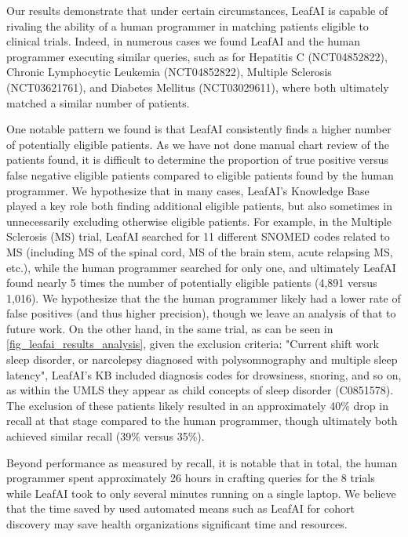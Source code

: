 \documentclass[../main.tex]{subfiles}
\begin{document}
Our results demonstrate that under certain circumstances, LeafAI is capable of rivaling the ability of a human programmer in matching patients eligible to clinical trials. Indeed, in numerous cases we found LeafAI and the human programmer executing similar queries, such as for Hepatitis C (NCT04852822), Chronic Lymphocytic Leukemia (NCT04852822), Multiple Sclerosis (NCT03621761), and Diabetes Mellitus (NCT03029611), where both ultimately matched a similar number of patients.

One notable pattern we found is that LeafAI consistently finds a higher number of potentially eligible patients. As we have not done manual chart review of the patients found, it is difficult to determine the proportion of true positive versus false negative eligible patients compared to eligible patients found by the human programmer. We hypothesize that in many cases, LeafAI's Knowledge Base played a key role both finding additional eligible patients, but also sometimes in unnecessarily excluding otherwise eligible patients. For example, in the Multiple Sclerosis (MS) trial, LeafAI searched for 11 different SNOMED codes related to MS (including MS of the spinal cord, MS of the brain stem, acute relapsing MS, etc.), while the human programmer searched for only one, and ultimately LeafAI found nearly 5 times the number of potentially eligible patients (4,891 versus 1,016). We hypothesize that the the human programmer likely had a lower rate of false positives (and thus higher precision), though we leave an analysis of that to future work. On the other hand, in the same trial, as can be seen in \ref{fig_leafai_results_analysis}, given the exclusion criteria: "Current shift work sleep disorder, or narcolepsy diagnosed with polysomnography and multiple sleep latency", LeafAI's KB included diagnosis codes for drowsiness, snoring, and so on, as within the UMLS they appear as child concepts of sleep disorder (C0851578). The exclusion of these patients likely resulted in an approximately 40\% drop in recall at that stage compared to the human programmer, though ultimately both achieved similar recall (39\% versus 35\%).

Beyond performance as measured by recall, it is notable that in total, the human programmer spent approximately 26 hours in crafting queries for the 8 trials while LeafAI took to only several minutes running on a single laptop. We believe that the time saved by used automated means such as LeafAI for cohort discovery may save health organizations significant time and resources.
\end{document}
